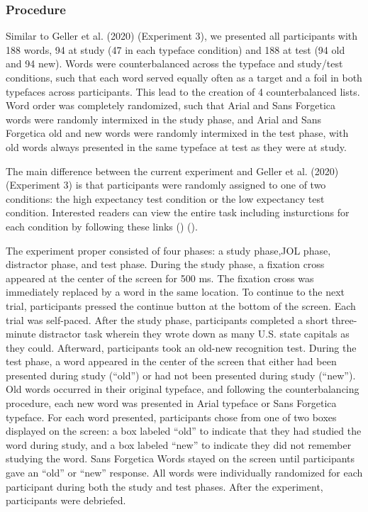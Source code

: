 \documentclass[
  english,
  man]{apa6}
\begin{document}
\hypertarget{procedure}{%
\subsubsection{Procedure}\label{procedure}}

Similar to Geller et al. (2020) (Experiment 3), we presented all participants with 188 words, 94 at study (47 in each typeface condition) and 188 at test (94 old and 94 new). Words were counterbalanced across the typeface and study/test conditions, such that each word served equally often as a target and a foil in both typefaces across participants. This lead to the creation of 4 counterbalanced lists. Word order was completely randomized, such that Arial and Sans Forgetica words were randomly intermixed in the study phase, and Arial and Sans Forgetica old and new words were randomly intermixed in the test phase, with old words always presented in the same typeface at test as they were at study.

The main difference between the current experiment and Geller et al. (2020) (Experiment 3) is that participants were randomly assigned to one of two conditions: the high expectancy test condition or the low expectancy test condition. Interested readers can view the entire task including insturctions for each condition by following these links () ().

The experiment proper consisted of four phases: a study phase,JOL phase, distractor phase, and test phase. During the study phase, a fixation cross appeared at the center of the screen for 500 ms. The fixation cross was immediately replaced by a word in the same location. To continue to the next trial, participants pressed the continue button at the bottom of the screen. Each trial was self-paced. After the study phase, participants completed a short three-minute distractor task wherein they wrote down as many U.S. state capitals as they could. Afterward, participants took an old-new recognition test. During the test phase, a word appeared in the center of the screen that either had been presented during study (\enquote{old}) or had not been presented during study (\enquote{new}). Old words occurred in their original typeface, and following the counterbalancing procedure, each new word was presented in Arial typeface or Sans Forgetica typeface. For each word presented, participants chose from one of two boxes displayed on the screen: a box labeled \enquote{old} to indicate that they had studied the word during study, and a box labeled \enquote{new} to indicate they did not remember studying the word. Sans Forgetica Words stayed on the screen until participants gave an \enquote{old} or \enquote{new} response. All words were individually randomized for each participant during both the study and test phases. After the experiment, participants were debriefed.
\end{document}
